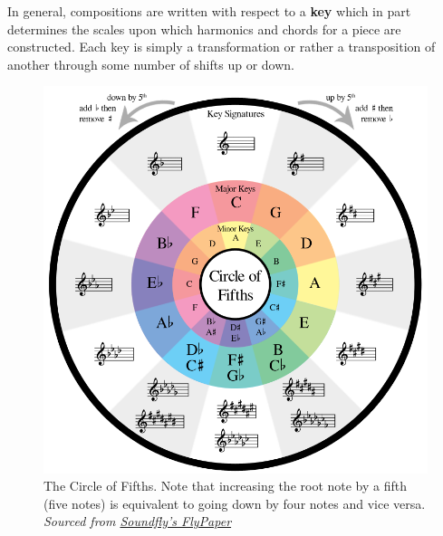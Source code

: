 \documentclass[12pt,]{article}
\begin{document}
In general, compositions are written with respect to a \textbf{key}
which in part determines the scales upon which harmonics and chords for
a piece are constructed. Each key is simply a transformation or rather a
transposition of another through some number of shifts up or down.

\vspace{35px}

\begin{figure}
\centering
\includegraphics[width=\textwidth,height=0.4\textheight]{Images/flypaperfifths.png}
\caption{The Circle of Fifths. Note that increasing the root note by a
fifth (five notes) is equivalent to going down by four notes and vice
versa.
\newline\textit{Sourced from \href{https://flypaper.soundfly.com/write/how-the-circle-of-fifths-can-help-your-songwriting/}{Soundfly's FlyPaper}}}
\end{figure}
\end{document}
